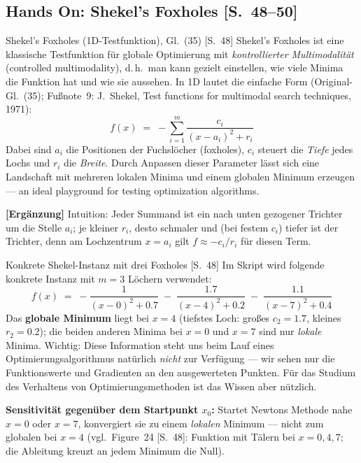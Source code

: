 \subsection{Hands On: Shekel's Foxholes [S.~48--50]}

\begin{defbox}{Shekel's Foxholes (1D-Testfunktion), Gl.~(35) [S.~48]}
Shekel's Foxholes ist eine klassische Testfunktion für globale Optimierung mit
\emph{kontrollierter Multimodalität} (controlled multimodality), d.\,h.\ man kann gezielt
einstellen, wie viele Minima die Funktion hat und wie sie aussehen. In 1D lautet die
einfache Form (Original-Gl.~(35); Fu{\ss}note~9: J.~Shekel, \glqq Test functions for
multimodal search techniques\grqq, 1971):
\[
  f(x) \;=\; -\sum_{i=1}^{m} \frac{c_i}{(x - a_i)^2 + r_i} \tag{35}
\]
Dabei sind $a_i$ die Positionen der \glqq Fuchslöcher\grqq{} (foxholes), $c_i$ steuert die
\emph{Tiefe} jedes Lochs und $r_i$ die \emph{Breite}. Durch Anpassen dieser Parameter
lässt sich eine Landschaft mit mehreren lokalen Minima und einem globalen Minimum
erzeugen --- \glqq an ideal playground for testing optimization algorithms\grqq.

\medskip
\textbf{[Ergänzung]} Intuition: Jeder Summand ist ein nach unten gezogener
\glqq Trichter\grqq{} um die Stelle $a_i$; je kleiner $r_i$, desto schmaler und (bei festem
$c_i$) tiefer ist der Trichter, denn am Lochzentrum $x=a_i$ gilt $f \approx -c_i/r_i$
für diesen Term.
\end{defbox}

\begin{bspbox}{Konkrete Shekel-Instanz mit drei Foxholes [S.~48]}
Im Skript wird folgende konkrete Instanz mit $m=3$ Löchern verwendet:
\[
  f(x) \;=\; -\frac{1}{(x-0)^2 + 0.7} \;-\; \frac{1.7}{(x-4)^2 + 0.2} \;-\; \frac{1.1}{(x-7)^2 + 0.4}
\]
Das \textbf{globale Minimum} liegt bei $x = 4$ (tiefstes Loch: gro{\ss}es $c_2 = 1.7$,
kleines $r_2 = 0.2$); die beiden anderen Minima bei $x = 0$ und $x = 7$ sind nur
\emph{lokale} Minima. Wichtig: Diese Information steht uns beim Lauf eines
Optimierungsalgorithmus natürlich \emph{nicht} zur Verfügung --- wir sehen nur die
Funktionswerte und Gradienten an den ausgewerteten Punkten. Für das Studium des
Verhaltens von Optimierungsmethoden ist das Wissen aber nützlich.

\medskip
\textbf{Sensitivität gegenüber dem Startpunkt $x_0$:} Startet Newtons Methode nahe
$x = 0$ oder $x = 7$, konvergiert sie zu einem \emph{lokalen} Minimum --- nicht zum
globalen bei $x = 4$ (vgl.\ Figure~24 [S.~48]: Funktion mit Tälern bei $x = 0, 4, 7$;
die Ableitung kreuzt an jedem Minimum die Null).
\end{bspbox}

